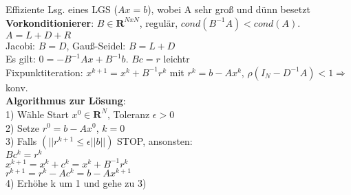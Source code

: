 Effiziente Lsg. eines LGS ($Ax = b$), wobei A sehr groß und dünn besetzt\\
\textbf{Vorkonditionierer}: $B \in \mathbf{R}^{NxN}$, regulär, $cond(B^{-1}A) < cond(A)$. $A = L + D + R$\\ 
Jacobi: $B=D$, Gauß-Seidel: $B = L + D$\\
Es gilt: $0 = -B^{-1}Ax + B^{-1}b$. $Bc = r$ leichtr\\
Fixpunktiteration: $x^{k+1} = x^k + B^{-1}r^k$ mit $r^k = b - Ax^k$,
$\rho(I_N - D^{-1}A)<1\Rightarrow$ konv. \\
\textbf{Algorithmus zur Lösung}:\\
1) Wähle Start $x^0 \in \mathbf{R}^N$, Toleranz $\epsilon > 0$\\
2) Setze $r^0 = b - Ax^0$, $k = 0$\\
3) Falls $(||r^{k+1} \leq \epsilon||b||)$ STOP, ansonsten:\\
\hspace*{5mm}$Bc^k = r^k$\\
\hspace*{5mm}$x^{k+1} = x^k + c^k = x^k + B^{-1}r^k$\\
\hspace*{5mm}$r^{k+1} = r^k - Ac^k = b - Ax^{k+1}$\\
4) Erhöhe k um 1 und gehe zu 3)


